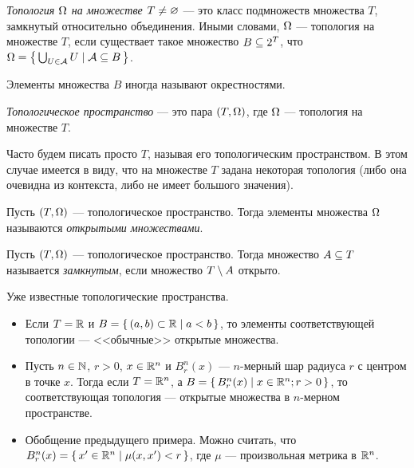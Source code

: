 \documentclass[main]{subfiles}
\begin{document}
\begin{definition}
	\emph{Топология $ \Omega $ на множестве $ T \neq \varnothing $} --- это класс подмножеств множества $ T $,
	замкнутый относительно объединения. Иными словами, $\Omega$ --- топология на множестве $ T $,
	если существает такое множество $ B \subseteq 2^T $,
	что $ \Omega = \left\{\, \bigcup_{U \in \mathcal{A}} U \mid \mathcal{A} \subseteq B \,\right\} $.
\end{definition}

\begin{remark}
	Элементы множества $ B $ иногда называют окрестностями.
\end{remark}

\begin{definition}
	\emph{Топологическое пространство} --- это пара $ (T, \Omega) $, где $ \Omega $ --- топология на множестве $ T $.
\end{definition}

\begin{remark}
	Часто будем писать просто $ T $, называя его топологическим пространством. В этом случае имеется в виду, что на
	множестве $ T $ задана некоторая топология (либо она очевидна из контекста, либо не имеет большого значения).
\end{remark}

\begin{definition}
	Пусть $ (T, \Omega) $ --- топологическое пространство.
	Тогда элементы множества $ \Omega $ называются \emph{открытыми множествами}.
\end{definition}

\begin{definition}
	Пусть $ (T, \Omega) $ --- топологическое пространство.
	Тогда множество $ A \subseteq T $ называется \emph{замкнутым}, если множество $ T \setminus A $ открыто.
\end{definition}

\begin{example} Уже известные топологические пространства.
	\begin{itemize}
		\item Если $ T = \mathbb{R} $ и $ B = \left\{\, (a, b) \subset \mathbb{R} \mid a < b \,\right\} $,
			то элементы соответствующей топологии ---
			<<обычные>> открытые множества.
		\item Пусть $ n \in \mathbb{N} $, $ r > 0 $, $ x \in \mathbb{R}^n $ и $ B^n_r(x) $ --- $ n $-мерный шар радиуса $ r $
			с центром в точке $ x $.
			Тогда если $ T = \mathbb{R}^n $, а $ B = \left\{\, B^n_r(x) \mid x \in \mathbb{R}^n; r > 0 \,\right\} $, то соответствующая топология
			--- открытые множества в $ n $-мерном пространстве.
		\item Обобщение предыдущего примера. Можно считать, что
			$ B^n_r(x) = \left\{\, x' \in \mathbb{R}^n \mid \mu(x, x') < r \,\right\} $,
			где $ \mu $ --- произвольная метрика в $ \mathbb{R}^n $.
	\end{itemize}
\end{example}
\end{document}
